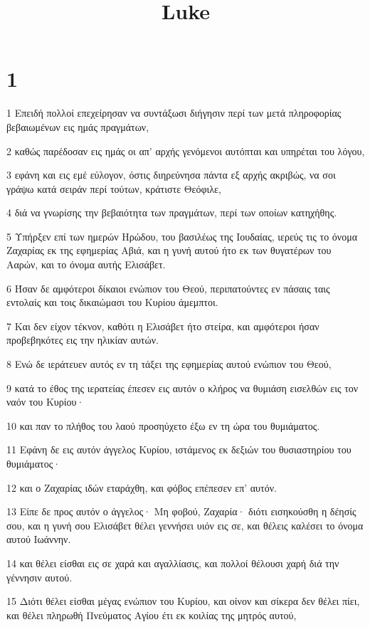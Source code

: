 

\title{Luke}


\chapter{1}

\par 1 Επειδή πολλοί επεχείρησαν να συντάξωσι διήγησιν περί των μετά πληροφορίας βεβαιωμένων εις ημάς πραγμάτων,
\par 2 καθώς παρέδοσαν εις ημάς οι απ' αρχής γενόμενοι αυτόπται και υπηρέται του λόγου,
\par 3 εφάνη και εις εμέ εύλογον, όστις διηρεύνησα πάντα εξ αρχής ακριβώς, να σοι γράψω κατά σειράν περί τούτων, κράτιστε Θεόφιλε,
\par 4 διά να γνωρίσης την βεβαιότητα των πραγμάτων, περί των οποίων κατηχήθης.
\par 5 Υπήρξεν επί των ημερών Ηρώδου, του βασιλέως της Ιουδαίας, ιερεύς τις το όνομα Ζαχαρίας εκ της εφημερίας Αβιά, και η γυνή αυτού ήτο εκ των θυγατέρων του Ααρών, και το όνομα αυτής Ελισάβετ.
\par 6 Ήσαν δε αμφότεροι δίκαιοι ενώπιον του Θεού, περιπατούντες εν πάσαις ταις εντολαίς και τοις δικαιώμασι του Κυρίου άμεμπτοι.
\par 7 Και δεν είχον τέκνον, καθότι η Ελισάβετ ήτο στείρα, και αμφότεροι ήσαν προβεβηκότες εις την ηλικίαν αυτών.
\par 8 Ενώ δε ιεράτευεν αυτός εν τη τάξει της εφημερίας αυτού ενώπιον του Θεού,
\par 9 κατά το έθος της ιερατείας έπεσεν εις αυτόν ο κλήρος να θυμιάση εισελθών εις τον ναόν του Κυρίου·
\par 10 και παν το πλήθος του λαού προσηύχετο έξω εν τη ώρα του θυμιάματος.
\par 11 Εφάνη δε εις αυτόν άγγελος Κυρίου, ιστάμενος εκ δεξιών του θυσιαστηρίου του θυμιάματος·
\par 12 και ο Ζαχαρίας ιδών εταράχθη, και φόβος επέπεσεν επ' αυτόν.
\par 13 Είπε δε προς αυτόν ο άγγελος· Μη φοβού, Ζαχαρία· διότι εισηκούσθη η δέησίς σου, και η γυνή σου Ελισάβετ θέλει γεννήσει υιόν εις σε, και θέλεις καλέσει το όνομα αυτού Ιωάννην.
\par 14 και θέλει είσθαι εις σε χαρά και αγαλλίασις, και πολλοί θέλουσι χαρή διά την γέννησιν αυτού.
\par 15 Διότι θέλει είσθαι μέγας ενώπιον του Κυρίου, και οίνον και σίκερα δεν θέλει πίει, και θέλει πληρωθή Πνεύματος Αγίου έτι εκ κοιλίας της μητρός αυτού,
